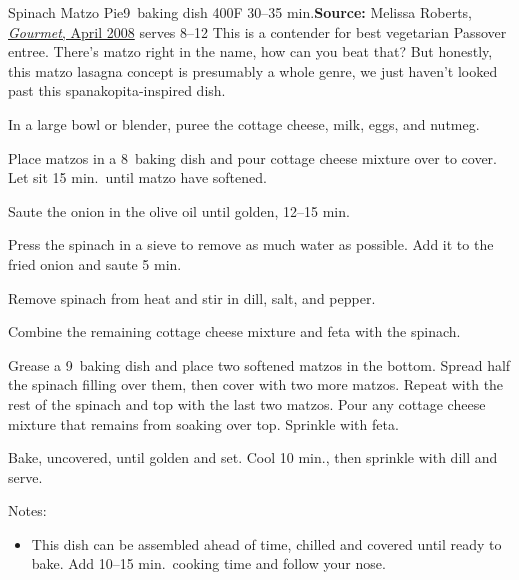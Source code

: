 \begin{recipe}{Spinach Matzo Pie}{9\inch{}\inch\ baking dish \hfill 400\0F \hfill 30--35 min.}{\textbf{Source:} Melissa Roberts, \href{https://www.epicurious.com/recipes/food/views/spinach-and-matzoh-pie-242019}{\textit{Gourmet}, April 2008} \hfill serves 8--12}
 \freeform This is a contender for best vegetarian Passover entree. There's matzo right in the name, how can you beat that? But honestly, this matzo lasagna concept is presumably a whole genre, we just haven't looked past this spanakopita-inspired dish.

 In a large bowl or blender, puree the cottage cheese, milk, eggs, and nutmeg.

 Place matzos in a 8\inch{}\inch\ baking dish and pour cottage cheese mixture over to cover. Let sit 15 min.\ until matzo have softened.

 Saute the onion in the olive oil until golden, 12--15 min.

 Press the spinach in a sieve to remove as much water as possible. Add it to the fried onion and saute 5 min.

 Remove spinach from heat and stir in dill, salt, and pepper.

 Combine the remaining cottage cheese mixture and feta with the spinach.

 Grease a 9\inch{}\inch\ baking dish and place two softened matzos in the bottom. Spread half the spinach filling over them, then cover with two more matzos. Repeat with the rest of the spinach and top with the last two matzos. Pour any cottage cheese mixture that remains from soaking over top. Sprinkle with feta.

 Bake, uncovered, until golden and set. Cool 10 min., then sprinkle with dill and serve.

 \freeform Notes:
 \begin{itemize}
  \item This dish can be assembled ahead of time, chilled and covered until ready to bake. Add 10--15 min.\ cooking time and follow your nose.
 \end{itemize}
\end{recipe}
